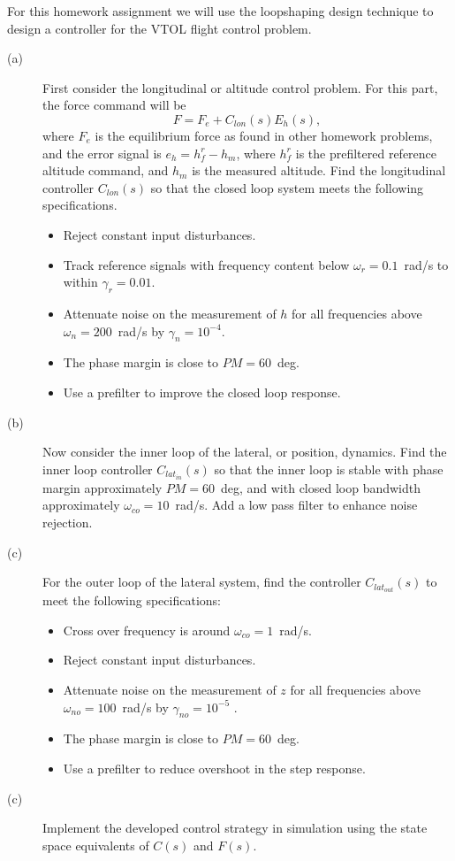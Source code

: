 For this homework assignment we will use the loopshaping design technique to design a controller for the VTOL flight control problem.
\begin{description}
	\item[(a)] First consider the longitudinal or altitude control problem.  For this part, the force command will be 
	\[
	F = F_e + C_{lon}(s)E_h(s),
	\]
	where $F_e$ is the equilibrium force as found in other homework problems, and the error signal is $e_h=h^r_f - h_m$, where $h^r_f$ is the prefiltered reference altitude command, and $h_m$ is the measured altitude.
	Find the longitudinal controller $C_{lon}(s)$ so that the closed loop system meets the following specifications.
	\begin{itemize}
		\item Reject constant input disturbances.
		\item Track reference signals with frequency content below $\omega_r=0.1$~rad/s to within $\gamma_r=0.01$.
	  	\item Attenuate noise on the measurement of $h$ for all frequencies above $\omega_n=200$~rad/s by $\gamma_n=10^{-4}$.
	  	\item The phase margin is close to $PM=60$~deg.
		\item Use a prefilter to improve the closed loop response.
	\end{itemize}
	\item[(b)]  Now consider the inner loop of the lateral, or position, dynamics.  Find the inner loop controller $C_{lat_{in}}(s)$ so that the inner loop is stable with phase margin approximately $PM=60$~deg, and with closed loop bandwidth approximately $\omega_{co}=10$~rad/s.  Add a low pass filter to enhance noise rejection.
	\item[(c)]  For the outer loop of the lateral system, find the controller $C_{lat_{out}}(s)$ to meet the following specifications:
		\begin{itemize}
			\item Cross over frequency is around $\omega_{co}=1$~rad/s.
			\item Reject constant input disturbances.
			\item Attenuate noise on the measurement of $z$ for all frequencies above $\omega_{no}=100$~rad/s by $\gamma_{no}=10^{-5}$ .
			\item The phase margin is close to $PM=60$~deg.
			\item Use a prefilter to reduce overshoot in the step response.
		\end{itemize}
	\item[(c)] Implement the developed control strategy in simulation using the state space equivalents of $C(s)$ and $F(s)$. 
\end{description}



